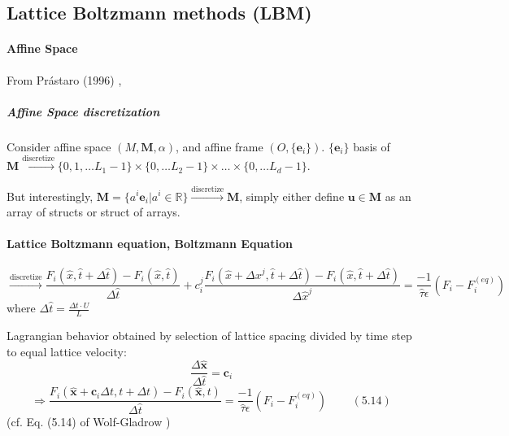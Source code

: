 \documentclass[twoside,landscape,10pt]{amsart}
\theoremstyle{plain}
\theoremstyle{definition}
\theoremstyle{remark}
\theoremstyle{remark}
\begin{document}
\begin{multicols*}{2}
\part{Lattice Boltzmann methods (LBM)}

\subsection{Affine Space}

From Pr\'{a}staro (1996) \cite{Pras1996},

\subsubsection{Affine Space discretization}

Consider affine space $(M,\mathbf{M},\alpha)$, and affine frame $(O,\lbrace \mathbf{e}_i \rbrace)$.  $\lbrace \mathbf{e}_i\rbrace$ basis of $\mathbf{M} \xrightarrow{\text{discretize}} \lbrace 0 , 1, \dots L_1 -1\rbrace \times \lbrace 0 ,  \dots L_2-1 \rbrace \times \dots \times \lbrace 0 ,  \dots L_d-1 \rbrace$.

But interestingly, $\mathbf{M} = \lbrace a^i \mathbf{e}_i | a^i \in \mathbb{R} \rbrace \xrightarrow{\text{discretize}} \mathbf{M}$, simply either define $\mathbf{u} \in \mathbf{M}$ as an array of structs or struct of arrays.  




\subsection{Lattice Boltzmann equation, Boltzmann Equation}



\[
\xrightarrow{\text{discretize}} \frac{F_i(\widehat{x},\widehat{t} + \Delta \widehat{t} )- F_i(\widehat{x},\widehat{t} ) }{ \Delta \widehat{t} } + c_i^j \frac{F_i(\widehat{x} + \Delta x^j, \widehat{t} + \Delta \widehat{t} )- F_i(\widehat{x}, \widehat{t} + \Delta \widehat{t} ) }{ \Delta \widehat{x}^j } = \frac{-1}{ \widehat{\tau} \epsilon } (F_i - F_i^{(eq)} )
\]
where $\Delta \widehat{t} = \frac{\Delta t \cdot U}{L}$

Lagrangian behavior obtained by selection of lattice spacing divided by time step to equal lattice velocity:
\begin{equation}
  \frac{ \Delta \widehat{ \mathbf{x}} }{ \Delta \widehat{t}} = \mathbf{c}_i 
\end{equation}
\begin{equation}
  \Longrightarrow \frac{ F_i(\widehat{\mathbf{x}} + \mathbf{c}_i \Delta t, t+ \Delta t ) - F_i(\widehat{\mathbf{x}} , t) }{ \Delta \widehat{t}} = \frac{-1}{ \widehat{\tau} \epsilon }( F_i-F_i^{(eq)} ) \qquad \, (5.14)
\end{equation} (cf. Eq. (5.14) of Wolf-Gladrow \cite{DWol2000})


\end{multicols*}
\end{document}
